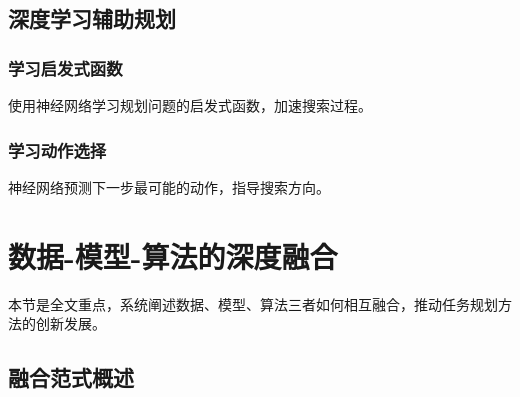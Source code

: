 \documentclass[12pt,a4paper]{ctexart}
\begin{document}
\subsection{深度学习辅助规划}

\subsubsection{学习启发式函数}

使用神经网络学习规划问题的启发式函数，加速搜索过程。

\subsubsection{学习动作选择}

神经网络预测下一步最可能的动作，指导搜索方向。

\section{数据-模型-算法的深度融合}

本节是全文重点，系统阐述数据、模型、算法三者如何相互融合，推动任务规划方法的创新发展。

\subsection{融合范式概述}
\end{document}
